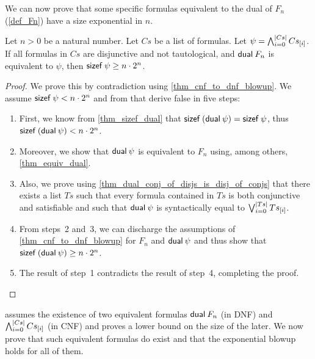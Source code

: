 \documentclass[a4paper,USenglish,cleveref, autoref, thm-restate]{lipics-v2021}
\theoremstyle{definition}
\begin{document}
We can now prove that some specific formulas equivalent to the dual of $F_n$ (\cref{def_Fn}) have a size exponential in $n$.

\begin{proposition}
  \label{thm_dnf_to_cnf_blowup}
  Let $n > 0$ be a natural number.
  Let $Cs$ be a list of formulas.
  Let $\psi = \bigwedge_{i = 0}^{\left|Cs\right|} {Cs}_{[i]}$.
  If all formulas in $Cs$ are disjunctive and not tautological, and $\mathsf{dual} \> F_n$ is equivalent to $\psi$,
  then $\mathsf{sizef} \> \psi \ge n \cdot 2^n$.
\end{proposition}
\begin{proof}
  We prove this by contradiction using \cref{thm_cnf_to_dnf_blowup}.
  We assume $\mathsf{sizef} \> \psi < n \cdot 2^n$ and from that derive false in five steps:
  \begin{enumerate}
    \item First, we know from \cref{thm_sizef_dual} that $\mathsf{sizef} \> (\mathsf{dual} \> \psi) = \mathsf{sizef} \> \psi$, thus $\mathsf{sizef} \> (\mathsf{dual} \> \psi) < n \cdot 2^n$.

    \item Moreover, we show that $\mathsf{dual} \> \psi$ is equivalent to $F_n$ using, among others, \cref{thm_equiv_dual}.

    \item Also, we prove using \cref{thm_dual_conj_of_disjs_is_disj_of_conjs} that there exists a list $Ts$ such that every formula contained in $Ts$ is both conjunctive and satisfiable and such that $\mathsf{dual} \> \psi$ is syntactically equal to $\bigvee_{i = 0}^{\left|Ts\right|} {Ts}_{[i]}$.

    \item From steps~2 and~3, we can discharge the assumptions of \cref{thm_cnf_to_dnf_blowup} for $F_n$ and $\mathsf{dual} \> \psi$ and thus show that $\mathsf{sizef} \> (\mathsf{dual} \> \psi) \ge n \cdot 2^n$.

    \item The result of step~1 contradicts the result of step~4, completing the proof. \qedhere
  \end{enumerate}
\end{proof}

 assumes the existence of two equivalent formulas $\mathsf{dual} \> F_n$ (in DNF) and $\bigwedge_{i = 0}^{\left|Cs\right|} {Cs}_{[i]}$ (in CNF) and proves a lower bound on the size of the later.
We now prove that such equivalent formulas do exist and that the exponential blowup holds for all of them.
\end{document}
